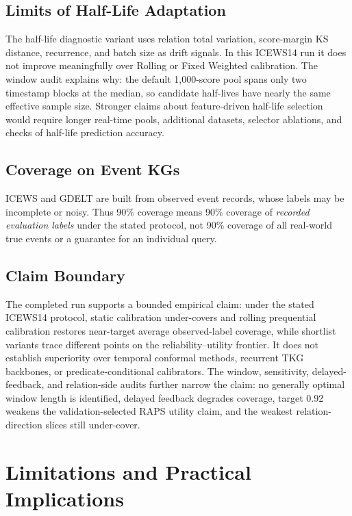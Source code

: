 \documentclass[information,article,submit,oneauthor,pdftex]{Definitions/mdpi}
\begin{document}
\subsection{Limits of Half-Life Adaptation}

The half-life diagnostic variant uses relation total variation, score-margin KS
distance, recurrence, and batch size as drift signals. In this ICEWS14 run it
does not improve meaningfully over Rolling or Fixed Weighted calibration. The
window audit explains why: the default 1,000-score pool spans only two
timestamp blocks at the median, so candidate half-lives have nearly the same
effective sample size. Stronger claims about feature-driven half-life selection
would require longer real-time pools, additional datasets, selector ablations,
and checks of half-life prediction accuracy.

\subsection{Coverage on Event KGs}

ICEWS and GDELT are built from observed event records, whose labels may be
incomplete or noisy. Thus 90\% coverage means 90\% coverage of
\emph{recorded evaluation labels} under the stated protocol, not 90\% coverage
of all real-world true events or a guarantee for an individual query.

\subsection{Claim Boundary}

The completed run supports a bounded empirical claim: under the stated ICEWS14
protocol, static calibration under-covers and rolling prequential calibration
restores near-target average observed-label coverage, while shortlist variants
trace different points on the reliability--utility frontier. It does not
establish superiority over temporal conformal methods, recurrent TKG backbones,
or predicate-conditional calibrators. The window, sensitivity, delayed-feedback,
and relation-side audits further narrow the claim: no generally optimal window
length is identified, delayed feedback degrades coverage, target 0.92 weakens
the validation-selected RAPS utility claim, and the weakest relation-direction
slices still under-cover.

\section{Limitations and Practical Implications}
\label{sec:limitations}
\end{document}
